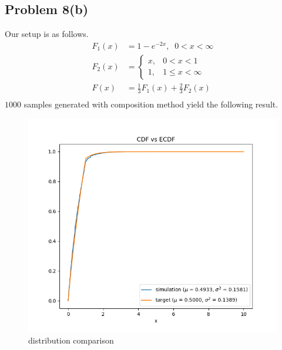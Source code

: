 \documentclass{article}
\begin{document}
\subsection*{Problem 8(b)}
Our setup is as follows.
\begin{align*}
  F_1(x) &= 1-e^{-2x},\;\; 0< x< \infty\\
  F_2(x) &= \begin{cases}
              x, & 0< x< 1\\
              1, & 1\le x<\infty
            \end{cases}\\
  F(x) &= \frac{1}{3}F_{1}(x) + \frac{2}{3}F_{2}(x)\\
\end{align*}
$1000$ samples generated with composition method yield the following result.
\begin{figure}[h!]
    \centering
    \includegraphics[width=\linewidth]{../images/p8b_1000.png}
    \caption{distribution comparison}
\end{figure}
\newpage
\end{document}

